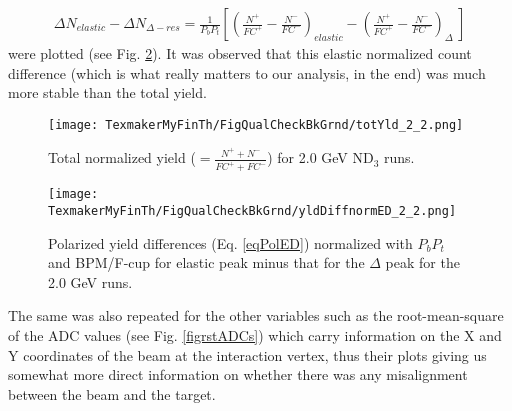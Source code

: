 \begin{eqnarray}
\label{eqPolED}
\Delta N_{elastic} - \Delta N_{\Delta-res} = \frac{1}{P_b P_t} \left[ \left( \frac{N^+}{FC^+} - \frac{N^-}{FC^-} \right)_{elastic} -   \left( \frac{N^+}{FC^+} - \frac{N^-}{FC^-} \right)_{\Delta} ~ \right]
\end{eqnarray}
were plotted (see Fig. \ref{figyldDiff}). It was observed %
that this elastic normalized count difference (which is what really matters to our analysis, in the end) was much more stable than the total yield.

\begin{figure} [H] %
  \leavevmode \texttt{[image: TexmakerMyFinTh/FigQualCheckBkGrnd/totYld\_2\_2.png]}  %
  \caption[Normalized total yield (2.0 GeV (ND$_3$))]{Total normalized yield ($= \frac{N^+ + N^-}{FC^+ + FC^-}$) for 2.0 GeV ND$_3$ runs.}
  \label{figyldTot}
\end{figure}



\begin{figure}[H] %
  \leavevmode \texttt{[image: TexmakerMyFinTh/FigQualCheckBkGrnd/yldDiffnormED\_2\_2.png]} 
  \caption[$\Delta N$ for elastic minus $\Delta$-resonance]{Polarized yield differences (Eq. \ref{eqPolED}) normalized with $P_bP_t$ and BPM/F-cup for elastic peak minus that for the $\Delta$ peak for the 2.0 GeV  runs.}
  \label{figyldDiff}
\end{figure}

The same was also repeated for the other variables such as the root-mean-square of the ADC values (see Fig. \ref{figrstADCs}) which carry information on the X and Y coordinates of the beam at the interaction vertex, thus their plots giving us somewhat more direct information on whether there was any misalignment between the beam and the target.

